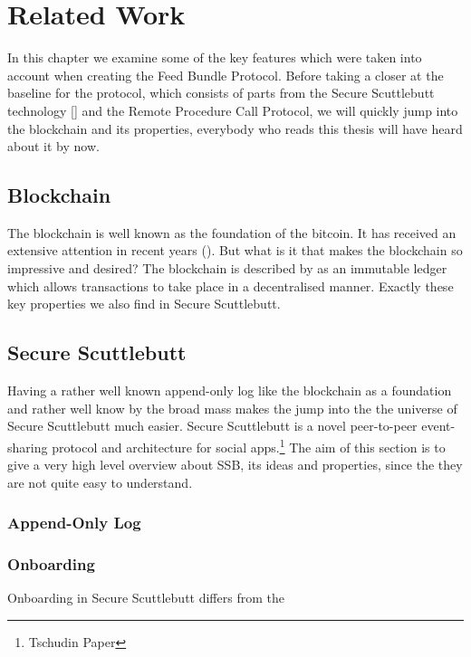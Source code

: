 \chapter{Related Work}
In this chapter we examine some of the key features which were taken into account when creating the Feed Bundle Protocol. Before taking a closer at the baseline for the protocol, which consists of parts from the Secure Scuttlebutt technology [] and the Remote Procedure Call Protocol, we will quickly jump into the blockchain and its properties, everybody who reads this thesis will have heard about it by now.
\section{Blockchain}
The blockchain is well known as the foundation of the bitcoin. It has received an extensive attention in recent years (\citet{8029379}). But what is it that makes the blockchain so impressive and desired? The blockchain is described by \citet{8029379} as an immutable ledger which allows transactions to take place in a decentralised manner. Exactly these key properties we also find in Secure Scuttlebutt.
\section{Secure Scuttlebutt}
Having a rather well known append-only log like the blockchain as a foundation and rather well know by the broad mass makes the jump into the the universe of Secure Scuttlebutt much easier. Secure Scuttlebutt is a novel peer-to-peer event-sharing protocol and architecture for social apps.\footnote{Tschudin Paper} The aim of this section is to give a very high level overview about SSB, its ideas
and properties, since the they are not quite easy to understand.

\subsection{Append-Only Log}

\subsection{Onboarding}
Onboarding in Secure Scuttlebutt differs from the

